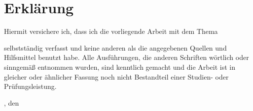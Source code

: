 \chapter{Erklärung}\label{ch:erklaerung}

Hiermit versichere ich, dass ich die vorliegende Arbeit mit dem Thema
\begin{quote}
    \textit{\titleDocument}
\end{quote}
selbstständig verfasst und keine anderen als die angegebenen Quellen und Hilfsmittel benutzt habe.
Alle Ausführungen, die anderen Schriften wörtlich oder sinngemäß entnommen wurden, sind kenntlich gemacht und die Arbeit ist in gleicher oder ähnlicher Fassung noch nicht Bestandteil einer Studien- oder Prüfungsleistung.
\\

\vspace*{2cm}

\begingroup
\setlength{\parindent}{0pt} %

\locationDocument, den \dateDocument
\bigskip
\bigskip

\newlength{\widthbox}
\settowidth{\widthbox}{\locationDocument, den \dateDocument}

\makebox[\widthbox]{\hrulefill}\\
\authorDocument
\endgroup
\newpage
